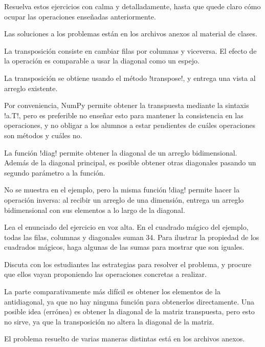\documentclass[10pt]{article}
\begin{document}

  Resuelva estos ejercicios con calma y detalladamente,
  hasta que quede claro cómo ocupar las operaciones enseñadas anteriormente.

  Las soluciones a los problemas
  están en los archivos anexos al material de clases.


  La transposición consiste en cambiar filas por columnas y viceversa.
  El efecto de la operación es comparable a usar la diagonal como un espejo.

  La transposición se obtiene usando el método \li!transpose!,
  y entrega una vista al arreglo existente.

  Por conveniencia,
  NumPy permite obtener la transpuesta mediante la sintaxis \li!a.T!,
  pero es preferible no enseñar esto
  para mantener la consistencia en las operaciones,
  y no obligar a los alumnos a estar pendientes
  de cuáles operaciones son métodos y cuáles no.


  La función \li!diag! permite obtener la diagonal de un arreglo bidimensional.
  Además de la diagonal principal,
  es posible obtener otras diagonales
  pasando un segundo parámetro a la función.

  No se muestra en el ejemplo,
  pero la misma función \li!diag!
  permite hacer la operación inversa:
  al recibir un arreglo de una dimensión,
  entrega un arreglo bidimensional
  con sus elementos a lo largo de la diagonal.


  Lea el enunciado del ejercicio en voz alta.
  En el cuadrado mágico del ejemplo,
  todas las filas, columnas y diagonales suman 34.
  Para ilustrar la propiedad de los cuadrados mágicos,
  haga algunas de las sumas para mostrar que son iguales.

  Discuta con los estudiantes
  las estrategias para resolver el problema,
  y procure que ellos vayan proponiendo
  las operaciones concretas a realizar.

  La parte comparativamente más difícil
  es obtener los elementos de la antidiagonal,
  ya que no hay ninguna función para obtenerlos directamente.
  Una posible idea (errónea) es obtener la diagonal
  de la matriz transpuesta, pero esto no sirve,
  ya que la transposición no altera la diagonal de la matriz.

  El problema resuelto de varias maneras distintas
  está en los archivos anexos.
\end{document}
